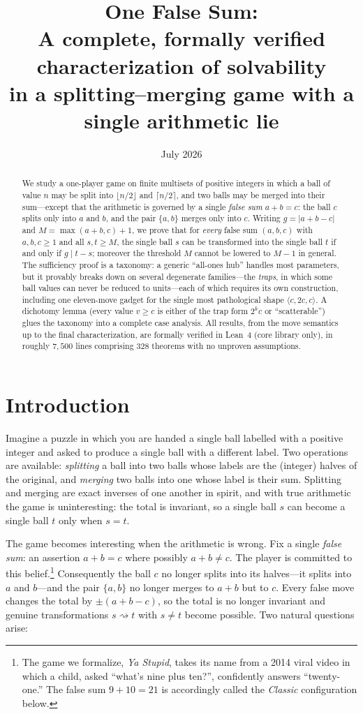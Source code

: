 \documentclass[11pt]{article}
\title{One False Sum:\\
\large A complete, formally verified characterization of solvability\\
in a splitting--merging game with a single arithmetic lie}
\author{}
\date{July 2026}
\theoremstyle{definition}
\theoremstyle{remark}
\newcommand{\lie}[3]{\langle #1,#2,#3\rangle}
\begin{document}
\maketitle

\begin{abstract}
We study a one-player game on finite multisets of positive integers in which a
ball of value $n$ may be split into $\lfloor n/2\rfloor$ and
$\lceil n/2\rceil$, and two balls may be merged into their sum---except that
the arithmetic is governed by a single \emph{false sum} $a+b=c$: the ball $c$
splits only into $a$ and $b$, and the pair $\{a,b\}$ merges only into $c$.
Writing $g=|a+b-c|$ and $M=\max(a+b,c)+1$, we prove that for
\emph{every} false sum $(a,b,c)$ with $a,b,c\ge 1$ and all
$s,t\ge M$, the single ball $s$ can be transformed into the single ball $t$
if and only if $g \mid t-s$; moreover the threshold $M$ cannot be lowered
to $M-1$ in general.  The sufficiency proof is a taxonomy: a generic
``all-ones hub'' handles most parameters, but it provably breaks down on
several degenerate families---the \emph{traps}, in which some ball values can
never be reduced to units---each of which requires its own construction,
including one eleven-move gadget for the single most pathological shape
$\lie{c}{2c}{c}$.  A dichotomy lemma (every value $v\ge c$ is either of the
trap form $2^k c$ or ``scatterable'') glues the taxonomy into a complete case
analysis.  All results, from the move semantics up to the final
characterization, are formally verified in Lean~4 (core library only), in
roughly $7{,}500$ lines comprising $328$ theorems with no unproven
assumptions.
\end{abstract}

\section{Introduction}

Imagine a puzzle in which you are handed a single ball labelled with a
positive integer and asked to produce a single ball with a different label.
Two operations are available: \emph{splitting} a ball into two balls whose
labels are the (integer) halves of the original, and \emph{merging} two balls
into one whose label is their sum.  Splitting and merging are exact inverses
of one another in spirit, and with true arithmetic the game is
uninteresting: the total is invariant, so a single ball $s$ can become a
single ball $t$ only when $s=t$.

The game becomes interesting when the arithmetic is wrong.  Fix a single
\emph{false sum}: an assertion $a+b=c$ where possibly $a+b\ne c$.  The player
is committed to this belief.\footnote{The game we formalize, \emph{Ya
Stupid}, takes its name from a 2014 viral video in which a child, asked
``what's nine plus ten?'', confidently answers ``twenty-one.''  The false sum
$9+10=21$ is accordingly called the \emph{Classic} configuration below.}
Consequently the ball $c$ no longer splits into its halves---it splits into
$a$ and $b$---and the pair $\{a,b\}$ no longer merges to $a+b$ but to $c$.
Every false move changes the total by $\pm(a+b-c)$, so the total is no longer
invariant and genuine transformations $s \rightsquigarrow t$ with $s \neq t$
become possible.  Two natural questions arise:
\end{document}
